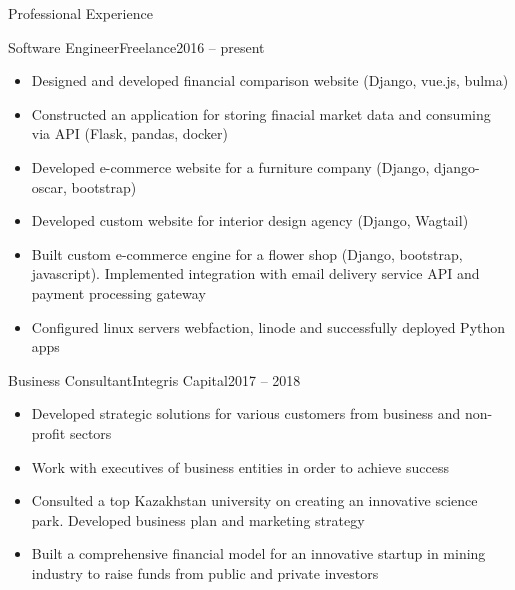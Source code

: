 \documentclass[]{mcdowellcv}
\begin{document}
\makeheader

\begin{cvsection}{Professional Experience}
  \begin{cvsubsection}{Software Engineer}{Freelance}{2016 -- present}
    \begin{itemize}
      \item Designed and developed financial comparison website (Django, vue.js, bulma)
      \item Constructed an application for storing finacial market data and consuming via API (Flask, pandas, docker)
      \item Developed e-commerce website for a furniture company (Django, django-oscar, bootstrap)
      \item Developed custom website for interior design agency (Django, Wagtail)
      \item Built custom e-commerce engine for a flower shop (Django, bootstrap, javascript). Implemented integration with email delivery service API and payment processing gateway
      \item Configured linux servers webfaction, linode and successfully deployed Python apps
    \end{itemize}
  \end{cvsubsection}

  \begin{cvsubsection}{Business Consultant}{Integris Capital}{2017 -- 2018}	
    \begin{itemize}
      \item Developed strategic solutions for various customers from business and non-profit sectors
      \item Work with executives of business entities in order to achieve success
      \item Consulted a top Kazakhstan university on creating an innovative science park. Developed business plan and marketing strategy
      \item Built a comprehensive financial model for an innovative startup in mining industry to raise funds from public and private investors
    \end{itemize}
  \end{cvsubsection}


\end{cvsection}
\end{document}

